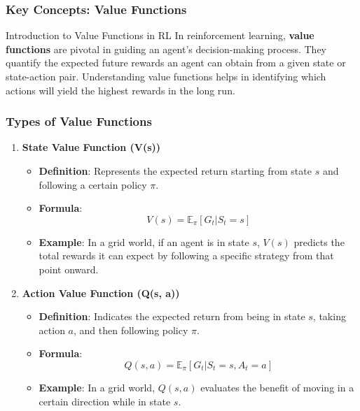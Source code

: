 \documentclass{beamer}
\begin{document}
\begin{frame}[fragile]
    \frametitle{Key Concepts: Value Functions}
    \begin{block}{Introduction to Value Functions in RL}
        In reinforcement learning, \textbf{value functions} are pivotal in guiding an agent’s decision-making process. They quantify the expected future rewards an agent can obtain from a given state or state-action pair. Understanding value functions helps in identifying which actions will yield the highest rewards in the long run.
    \end{block}
\end{frame}

\begin{frame}[fragile]
    \frametitle{Types of Value Functions}
    \begin{enumerate}
        \item \textbf{State Value Function (V(s))}
        \begin{itemize}
            \item \textbf{Definition}: Represents the expected return starting from state \(s\) and following a certain policy \(\pi\).
            \item \textbf{Formula}:
            \begin{equation}
                V(s) = \mathbb{E}_\pi [G_t | S_t = s]
            \end{equation}
            \item \textbf{Example}: In a grid world, if an agent is in state \(s\), \(V(s)\) predicts the total rewards it can expect by following a specific strategy from that point onward.
        \end{itemize}
        
        \item \textbf{Action Value Function (Q(s, a))}
        \begin{itemize}
            \item \textbf{Definition}: Indicates the expected return from being in state \(s\), taking action \(a\), and then following policy \(\pi\).
            \item \textbf{Formula}:
            \begin{equation}
                Q(s, a) = \mathbb{E}_\pi [G_t | S_t = s, A_t = a]
            \end{equation}
            \item \textbf{Example}: In a grid world, \(Q(s, a)\) evaluates the benefit of moving in a certain direction while in state \(s\).
        \end{itemize}
    \end{enumerate}
\end{frame}
\end{document}
